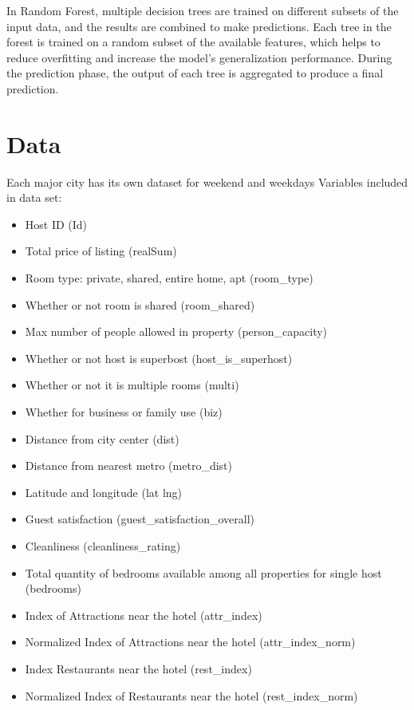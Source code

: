 \documentclass[
]{article}
\providecommand{\tightlist}{%
  \setlength{\itemsep}{0pt}\setlength{\parskip}{0pt}}
\begin{document}
In Random Forest, multiple decision trees are trained on different
subsets of the input data, and the results are combined to make
predictions. Each tree in the forest is trained on a random subset of
the available features, which helps to reduce overfitting and increase
the model's generalization performance. During the prediction phase, the
output of each tree is aggregated to produce a final prediction.

\hypertarget{data}{%
\section{Data}\label{data}}

Each major city has its own dataset for weekend and weekdays Variables
included in data set:

\begin{itemize}
\tightlist
\item
  Host ID (Id)
\item
  Total price of listing (realSum)
\item
  Room type: private, shared, entire home, apt (room\_type)
\item
  Whether or not room is shared (room\_shared)
\item
  Max number of people allowed in property (person\_capacity)
\item
  Whether or not host is superbost (host\_is\_superhost)
\item
  Whether or not it is multiple rooms (multi)
\item
  Whether for business or family use (biz)
\item
  Distance from city center (dist)
\item
  Distance from nearest metro (metro\_dist)
\item
  Latitude and longitude (lat lng)
\item
  Guest satisfaction (guest\_satisfaction\_overall)
\item
  Cleanliness (cleanliness\_rating)
\item
  Total quantity of bedrooms available among all properties for single
  host (bedrooms)
\item
  Index of Attractions near the hotel (attr\_index)
\item
  Normalized Index of Attractions near the hotel (attr\_index\_norm)
\item
  Index Restaurants near the hotel (rest\_index)
\item
  Normalized Index of Restaurants near the hotel (rest\_index\_norm)
\end{itemize}
\end{document}
